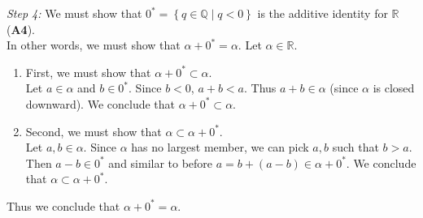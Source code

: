 \documentclass[../main.tex]{subfiles}
\begin{document}
\emph{Step 4:} We must show that \( 0^* =\left\{ q \in \mathbb{Q} \mid q < 0 \right\}\) is the additive identity for \( \mathbb{R} \) (\textbf{A4}). \\
In other words, we must show that \( \alpha + 0^* = \alpha \).
Let \( \alpha \in \mathbb{R} \).
\begin{enumerate}
    \item First, we must show that \( \alpha + 0^* \subset \alpha \). \\
    Let \( a \in \alpha \) and \( b \in 0^* \).
    Since \( b < 0 \), \( a + b < a \).
    Thus \( a + b \in \alpha \) (since \( \alpha \) is closed downward).
    We conclude that \( \alpha + 0^* \subset \alpha \).

    \item Second, we must show that \( \alpha \subset \alpha + 0^* \). \\
    Let \( a,b \in \alpha \). Since \( \alpha \) has no largest member, we can pick \( a,b \) such that \( b > a \).
    Then \( a - b \in 0^* \) and similar to before \( a = b + (a - b) \in \alpha + 0^* \).
    We conclude that \( \alpha \subset \alpha + 0^* \).
\end{enumerate}
Thus we conclude that \( \alpha + 0^* = \alpha \).
\end{document}
